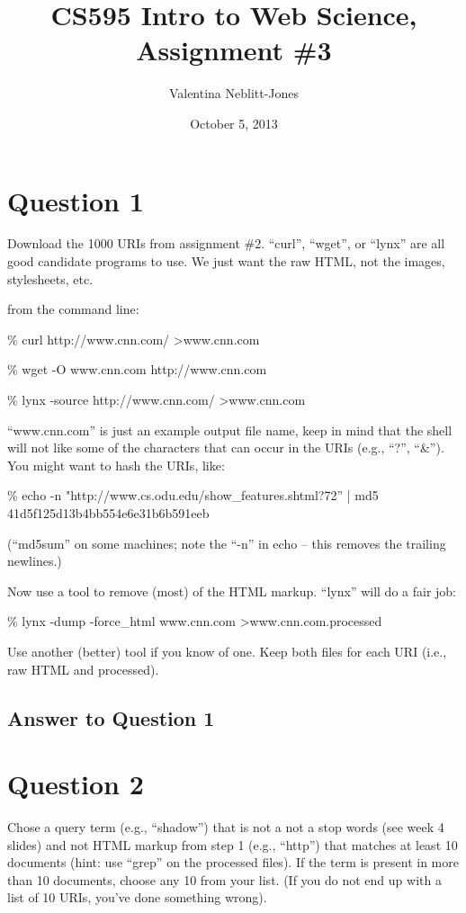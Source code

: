 \documentclass{article}
\begin{document}
\title{CS595 Intro to Web Science, Assignment \#3}
\author{Valentina Neblitt-Jones}
\date{October 5, 2013}
\maketitle

\section*{Question 1}

Download the 1000 URIs from assignment \#2. ``curl'', ``wget'', or ``lynx'' are all good candidate programs to use. We just want the raw HTML, not the images, stylesheets, etc.

from the command line:

\% curl http://www.cnn.com/  \textgreater  www.cnn.com

\% wget -O www.cnn.com http://www.cnn.com

\% lynx -source http://www.cnn.com/ \textgreater www.cnn.com

``www.cnn.com'' is just an example output file name, keep in mind that the shell will not like some of the characters that can occur in the URIs (e.g., ``?'', ``\&''). You might want to hash the URIs, like:

\% echo -n "http://www.cs.odu.edu/show\_features.shtml?72'' | md5
41d5f125d13b4bb554e6e31b6b591eeb

(``md5sum'' on some machines; note the ``-n'' in echo -- this removes the trailing newlines.)

Now use a tool to remove (most) of the HTML markup. ``lynx'' will do a fair job:

\% lynx -dump -force\_html www.cnn.com \textgreater www.cnn.com.processed

Use another (better) tool if you know of one. Keep both files for each URI (i.e., raw HTML and processed).

\subsection*{Answer to Question 1}

\section*{Question 2}

Chose a query term (e.g., ``shadow'') that is not a not a stop words (see week 4 slides) and not HTML markup from step 1 (e.g., ``http'') that matches at least 10 documents (hint: use ``grep'' on the processed files). If the term is present in more than 10 documents, choose any 10 from your list. (If you do not end up with a list of 10 URIs, you've done something wrong).
\end{document}
